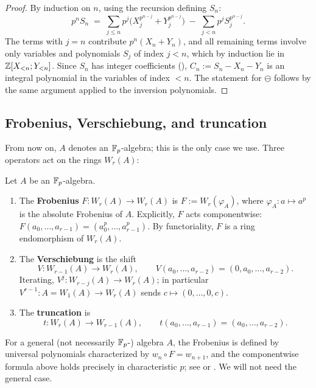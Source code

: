 \begin{proof}
By induction on $n$, using the recursion defining $S_n$:
\[
p^n S_n \;=\; \sum_{j \leq n} p^j \bigl(X_j^{p^{n-j}} + Y_j^{p^{n-j}}\bigr)
\;-\; \sum_{j < n} p^j S_j^{p^{n-j}} .
\]
The terms with $j = n$ contribute $p^n (X_n + Y_n)$, and all remaining terms involve
only variables and polynomials $S_j$ of index $j < n$, which by induction lie in
$\mathbb{Z}[X_{<n}; Y_{<n}]$. Since $S_n$ has integer coefficients
(), $C_n := S_n - X_n - Y_n$ is an integral
polynomial in the variables of index $< n$. The statement for $\ominus$ follows by the
same argument applied to the inversion polynomials.
\end{proof}

\subsection{Frobenius, Verschiebung, and truncation}

From now on, $A$ denotes an $\mathbb{F}_p$-algebra; this is the only case we use. Three
operators act on the rings $W_r(A)$:

\begin{definition}\label{definition:witt_operators}
Let $A$ be an $\mathbb{F}_p$-algebra.
\begin{enumerate}
    \item The \textbf{Frobenius} $F \colon W_r(A) \to W_r(A)$ is
    $F := W_r(\varphi_A)$, where $\varphi_A \colon a \mapsto a^p$ is the absolute
    Frobenius of $A$. Explicitly, $F$ acts componentwise:
    $F(a_0, \dots, a_{r-1}) = (a_0^p, \dots, a_{r-1}^p)$. By functoriality, $F$ is a
    ring endomorphism of $W_r(A)$.
    \item The \textbf{Verschiebung} is the shift
    \[
    V \colon W_{r-1}(A) \to W_r(A),
    \qquad
    V(a_0, \dots, a_{r-2}) = (0, a_0, \dots, a_{r-2}).
    \]
    Iterating, $V^j \colon W_{r-j}(A) \to W_r(A)$; in particular
    $V^{r-1} \colon A = W_1(A) \to W_r(A)$ sends $c \mapsto (0, \dots, 0, c)$.
    \item The \textbf{truncation} is
    \[
    t \colon W_r(A) \to W_{r-1}(A),
    \qquad
    t(a_0, \dots, a_{r-1}) = (a_0, \dots, a_{r-2}).
    \]
\end{enumerate}
\end{definition}

\begin{rem*}
For a general (not necessarily $\mathbb{F}_p$-) algebra $A$, the Frobenius is defined by
universal polynomials characterized by $w_n \circ F = w_{n+1}$, and the componentwise
formula above holds precisely in characteristic $p$; see
\cite[II, \S6]{serreLF} or \cite[\S2]{Rabinoff2014Witt}. We will not need the general
case.
\end{rem*}

